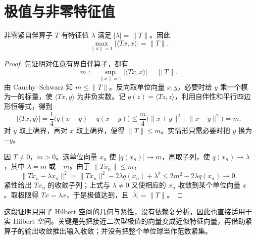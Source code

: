 \documentclass[UTF8,12pt,a4paper,fontset=fandol]{ctexbook}
\begin{document}
\section{极值与非零特征值}
\begin{proposition}\label{prop:fa-compact-extreme}
非零紧自伴算子 $T$ 有特征值 $\lambda$ 满足 $|\lambda|=\|T\|$。因此
\[
 \max_{\|x\|=1}|\langle Tx,x\rangle|=\|T\|.
\]
\end{proposition}
\begin{proof}
先证明对任意有界自伴算子，都有
\[
 m:=\sup_{\|x\|=1}|\langle Tx,x\rangle|=\|T\|.
\]
由 Cauchy--Schwarz 知 $m\leq\|T\|$。反向取单位向量 $x,y$，必要时给 $y$ 乘一个模为一的标量，使 $\langle Tx,y\rangle$ 为非负实数。记 $q(z)=\langle Tz,z\rangle$，利用自伴性和平行四边形恒等式，得到
\[
 |\langle Tx,y\rangle|
 =\frac14\bigl(q(x+y)-q(x-y)\bigr)
 \leq\frac m4\bigl(\|x+y\|^2+\|x-y\|^2\bigr)=m.
\]
对 $y$ 取上确界，再对 $x$ 取上确界，便得 $\|T\|\leq m$。实情形只需必要时把 $y$ 换为 $-y$。

因 $T\ne0$，$m>0$。选单位向量 $x_n$ 使 $|q(x_n)|\to m$，再取子列，使 $q(x_n)\to\lambda$，其中 $\lambda=m$ 或 $-m$。由于 $\|Tx_n\|\leq m$，
\[
 \|Tx_n-\lambda x_n\|^2
 =\|Tx_n\|^2-2\lambda q(x_n)+\lambda^2
 \leq 2m^2-2\lambda q(x_n)\longrightarrow0.
\]
紧性给出 $Tx_n$ 的收敛子列；上式与 $\lambda\ne0$ 又使相应的 $x_n$ 收敛到某个单位向量 $x$。取极限得 $Tx=\lambda x$，于是极值达到，且 $|\lambda|=\|T\|$。
\end{proof}
这段证明只用了 Hilbert 空间的几何与紧性，没有依赖复分析，因此也直接适用于实 Hilbert 空间。关键是先把接近二次型极值的向量变成近似特征向量，再借助紧算子的输出收敛推出输入收敛；并没有把整个单位球当作范数紧集。
\end{document}
